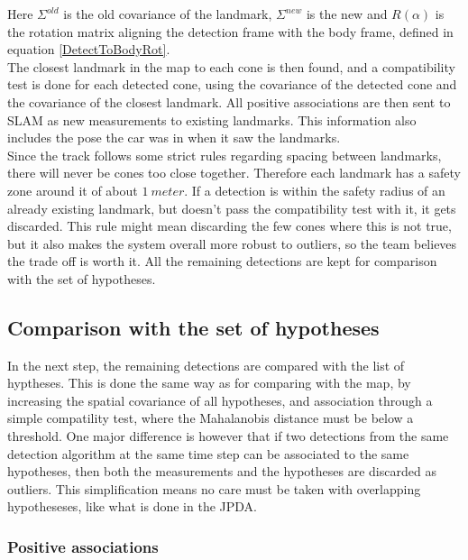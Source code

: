 Here $\Sigma^{old}$ is the old covariance of the landmark, $\Sigma^{new}$ is the new and $R(\alpha)$ is the rotation matrix aligning the detection frame with the body frame, defined in equation \ref{DetectToBodyRot}. \\

The closest landmark in the map to each cone is then found, and a compatibility test is done for each detected cone, using the covariance of the detected cone and the covariance of the closest landmark. All positive associations are then sent to SLAM as new measurements to existing landmarks. This information also includes the pose the car was in when it saw the landmarks. \\

Since the track follows some strict rules regarding spacing between landmarks, there will never be  cones too close together. Therefore each landmark has a safety zone around it of about $\SI{1}{meter}$. If a detection is within the safety radius of an already existing landmark, but doesn't pass the compatibility test with it, it gets discarded. This rule might mean discarding the few cones where this is not true, but it also makes the system overall more robust to outliers, so the team believes the trade off is worth it.  All the remaining detections are kept for comparison with the set of hypotheses. \\

\subsection{Comparison with the set of hypotheses}

In the next step, the remaining detections are compared with the list of hyptheses. This is done the same way as for comparing with the map, by increasing the spatial covariance of all hypotheses, and association through a simple compatility test, where the Mahalanobis distance must be below a threshold. One major difference is however that if two detections from the same detection algorithm at the same time step can be associated to the same hypotheses, then both the measurements and the hypotheses are discarded as outliers. This simplification means no care must be taken with overlapping hypotheseses, like what is done in the JPDA. \\

\subsubsection{Positive associations}

